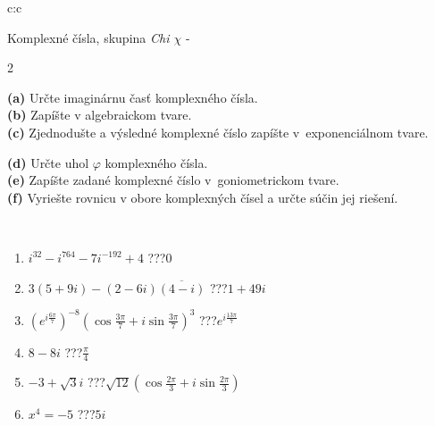 \documentclass[10pt]{report}
\begin{document}
\begin{tabular}{c:c}
\begin{minipage}[c][104.5mm][t]{0.5\linewidth}
\begin{center}
\vspace{7mm}
{\huge Komplexné čísla, skupina \textit{Chi $\chi$} -}\\[5mm]
\begin{minipage}{0.95\linewidth}
\begin{center}
{\small \begin{multicols}{2} \raggedright
\textbf{(a)} Určte imaginárnu časť komplexného čísla. \\[1mm]
\textbf{(b)} Zapíšte v algebraickom tvare. \\[1mm]
\textbf{(c)} Zjednodušte a výsledné komplexné číslo zapíšte v~exponenciálnom tvare. \par \columnbreak
\textbf{(d)} Určte uhol \(\varphi\) komplexného čísla. \\[1mm]
\textbf{(e)} Zapíšte zadané komplexné číslo v~goniometrickom tvare. \\[1mm]
\textbf{(f)} Vyriešte rovnicu v obore komplexných čísel a určte súčin jej riešení.
\end{multicols}
}
\end{center}
\end{minipage}
\\[4mm]
\begin{minipage}{0.79\linewidth}
\begin{center}
\begin{varwidth}{\linewidth}
\begin{enumerate}
\large
\item $i^{32}-i^{764}-7i^{-192}+4$\quad \dotfill\; ???\;\dotfill \quad $0$
\item $3(5+9i)-(2-6i)\overline{(4-i)}$\quad \dotfill\; ???\;\dotfill \quad $1+49i$
\item $\left(e^{i\frac{6\pi}{7}}\right)^{-8}\left(\cos{\frac{3\pi}{7}}+i\sin{\frac{3\pi}{7}}\right)^{3}$\quad \dotfill\; ???\;\dotfill \quad $e^{i\frac{13\pi}{7}}$
\item $8-8i$\quad \dotfill\; ???\;\dotfill \quad $\frac{\pi}{4}$
\item $-3+\sqrt{3}i$\quad \dotfill\; ???\;\dotfill \quad $\sqrt{12}\left(\cos{\frac{2\pi}{3}}+i\sin{\frac{2\pi}{3}}\right)$
\item $x^4=-5$\quad \dotfill\; ???\;\dotfill \quad $5i$
\end{enumerate}
\end{varwidth}

\end{center}
\end{minipage}
\end{center}
\end{minipage}
\end{tabular}
\end{document}
